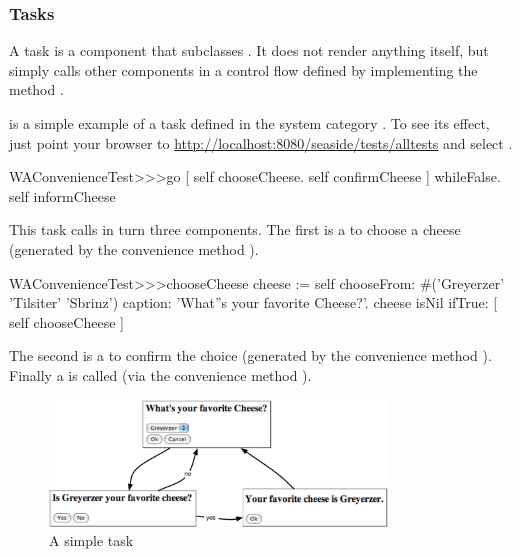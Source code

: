 \documentclass[a4paper,10pt,twoside]{book}
\begin{document}
\subsubsection{Tasks}

A task is a component that subclasses .
It does not render anything itself, but simply calls other components in a control flow defined by implementing the method .

 is a simple example of a task defined in the system category .
To see its effect, just point your browser to \url{http://localhost:8080/seaside/tests/alltests} and select .

\begin{code}{}
WAConvenienceTest>>>go
	[ self chooseCheese.
	  self confirmCheese ] whileFalse.
	self informCheese
\end{code}

This task calls in turn three components.
The first is a  to choose a cheese (generated by the convenience method ).

\begin{code}{}
WAConvenienceTest>>>chooseCheese
	cheese := self
		chooseFrom: #('Greyerzer' 'Tilsiter' 'Sbrinz')
		caption: 'What''s your favorite Cheese?'.
	cheese isNil ifTrue: [ self chooseCheese ]
\end{code}

The second is a  to confirm the choice (generated by the convenience method ).
Finally a  is called (via the convenience method ).

\begin{figure}[ht]
\begin{center}
\includegraphics[width=0.8\textwidth]{chooseCheese}
\caption{A simple task}
\label{fig:chooseCheese}
\end{center}
\end{figure}
\end{document}
